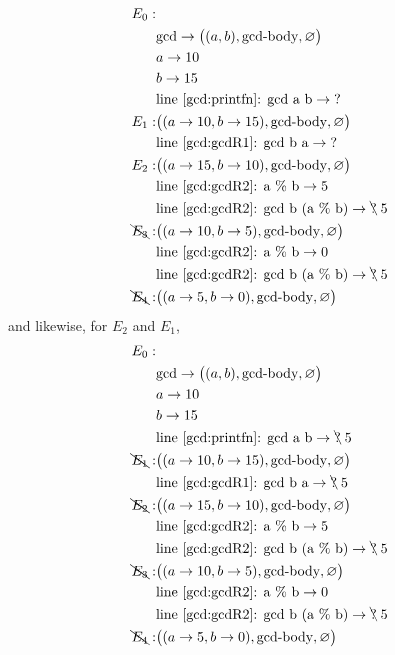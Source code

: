 \begin{align*}
  E_0:&\\
      & \text{gcd} \rightarrow \big((a, b), \text{gcd-body}, \varnothing\big)\\
      & a \rightarrow 10\\
      & b \rightarrow 15\\
      & \text{line~\ref{gcd:printfn}: gcd a b} \rightarrow \text{?}\\
  E_1:& \big((a \rightarrow 10, b \rightarrow 15), \text{gcd-body}, \varnothing\big)\\
      & \text{line~\ref{gcd:gcdR1}: gcd b a} \rightarrow \text{?}\\
  E_2:& \big((a \rightarrow 15, b \rightarrow 10), \text{gcd-body}, \varnothing\big)\\
      & \text{line~\ref{gcd:gcdR2}: a \% b} \rightarrow 5\\
      & \text{line~\ref{gcd:gcdR2}: gcd b (a \% b)} \rightarrow \bcancel{\text{?}}\; 5\\
  \bcancel{E_3}:& \big((a \rightarrow 10, b \rightarrow 5), \text{gcd-body}, \varnothing\big)\\
      & \text{line~\ref{gcd:gcdR2}: a \% b} \rightarrow 0\\
      & \text{line~\ref{gcd:gcdR2}: gcd b (a \% b)} \rightarrow \bcancel{\text{?}}\; 5\\
  \bcancel{E_4}:& \big((a \rightarrow 5, b \rightarrow 0), \text{gcd-body}, \varnothing\big)\\
\end{align*}
and likewise, for $E_2$ and $E_1$,
\begin{align*}
  E_0:&\\
      & \text{gcd} \rightarrow \big((a, b), \text{gcd-body}, \varnothing\big)\\
      & a \rightarrow 10\\
      & b \rightarrow 15\\
      & \text{line~\ref{gcd:printfn}: gcd a b} \rightarrow \bcancel{\text{?}}\; 5\\
  \bcancel{E_1}:& \big((a \rightarrow 10, b \rightarrow 15), \text{gcd-body}, \varnothing\big)\\
      & \text{line~\ref{gcd:gcdR1}: gcd b a} \rightarrow \bcancel{\text{?}}\; 5\\
  \bcancel{E_2}:& \big((a \rightarrow 15, b \rightarrow 10), \text{gcd-body}, \varnothing\big)\\
      & \text{line~\ref{gcd:gcdR2}: a \% b} \rightarrow 5\\
      & \text{line~\ref{gcd:gcdR2}: gcd b (a \% b)} \rightarrow \bcancel{\text{?}}\; 5\\
  \bcancel{E_3}:& \big((a \rightarrow 10, b \rightarrow 5), \text{gcd-body}, \varnothing\big)\\
      & \text{line~\ref{gcd:gcdR2}: a \% b} \rightarrow 0\\
      & \text{line~\ref{gcd:gcdR2}: gcd b (a \% b)} \rightarrow \bcancel{\text{?}}\; 5\\
  \bcancel{E_4}:& \big((a \rightarrow 5, b \rightarrow 0), \text{gcd-body}, \varnothing\big)\\
\end{align*}
